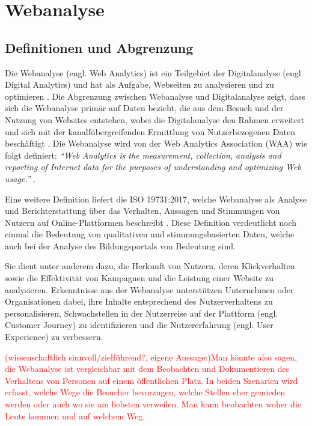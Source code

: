 \chapter{Webanalyse} %
\label{ch:webanalyse} 

\section{Definitionen und Abgrenzung} %
Die Webanalyse (engl. Web Analytics) ist ein Teilgebiet der Digitalanalyse (engl. Digital Analytics) und hat als Aufgabe, Webseiten zu analysieren und zu optimieren \parencite[Kap.1.2]{Hassler2019}. Die Abgrenzung zwischen Webanalyse und Digitalanalyse zeigt, dass sich die Webanalyse primär auf Daten bezieht, die aus dem Besuch und der Nutzung von Websites entstehen, wobei die Digitalanalyse den Rahmen erweitert und sich mit der kanalfübergreifenden Ermittlung von Nutzerbezogenen Daten beschäftigt \parencite[Kap.1.2]{Hassler2019}. Die Webanalyse wird von der Web Analytics Association (WAA) wie folgt definiert: \textit{``Web Analytics is the measurement, collection, analysis and reporting of Internet data for the purposes of understanding and optimizing Web usage.''} \parencite[3]{WAA2008}.

Eine weitere Definition liefert die ISO 19731:2017, welche Webanalyse als Analyse und Berichterstattung über das Verhalten, Aussagen und Stimmungen von Nutzern auf Online-Plattformen beschreibt \parencite[Kap.3.40]{ISO2017}. Diese Definition verdeutlicht noch einmal die Bedeutung von qualitativen und stimmungsbasierten Daten, welche auch bei der Analyse des Bildungsportals von Bedeutung sind.

Sie dient unter anderem dazu, die Herkunft von Nutzern, deren Klickverhalten sowie die Effektivität von Kampagnen und die Leistung einer Website zu analysieren. Erkenntnisse aus der Webanalyse unterstützen Unternehmen oder Organisationen dabei, ihre Inhalte entsprechend des Nutzerverhaltens zu personalisieren, Schwachstellen in der Nutzerreise auf der Plattform (engl. Customer Journey) zu identifizieren und die Nutzererfahrung (engl. User Experience) zu verbessern. \parencite{PiwikProWebanalyse}

\textcolor{red}{
    (wissenschaftlich sinnvoll/zielführend?, eigene Aussage:)Man könnte also sagen, die Webanalyse ist vergleichbar mit dem Beobachten und Dokumentieren des Verhaltens von Personen auf einem öffentlichen Platz. In beiden Szenarien wird erfasst, welche Wege die Besucher bevorzugen, welche Stellen eher gemieden werden oder auch wo sie am liebsten verweilen. Man kann beobachten woher die Leute kommen und auf welchem Weg.
}

